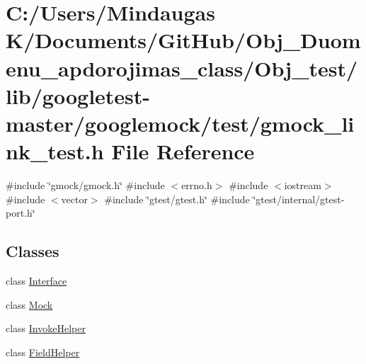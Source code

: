 \hypertarget{_obj__test_2lib_2googletest-master_2googlemock_2test_2gmock__link__test_8h}{}\section{C\+:/\+Users/\+Mindaugas K/\+Documents/\+Git\+Hub/\+Obj\+\_\+\+Duomenu\+\_\+apdorojimas\+\_\+class/\+Obj\+\_\+test/lib/googletest-\/master/googlemock/test/gmock\+\_\+link\+\_\+test.h File Reference}
\label{_obj__test_2lib_2googletest-master_2googlemock_2test_2gmock__link__test_8h}
{\ttfamily \#include \char`\"{}gmock/gmock.\+h\char`\"{}}\newline
{\ttfamily \#include $<$errno.\+h$>$}\newline
{\ttfamily \#include $<$iostream$>$}\newline
{\ttfamily \#include $<$vector$>$}\newline
{\ttfamily \#include \char`\"{}gtest/gtest.\+h\char`\"{}}\newline
{\ttfamily \#include \char`\"{}gtest/internal/gtest-\/port.\+h\char`\"{}}\newline
\subsection*{Classes}
\begin{DoxyCompactItemize}
\item 
class \mbox{\hyperlink{class_interface}{Interface}}
\item 
class \mbox{\hyperlink{class_mock}{Mock}}
\item 
class \mbox{\hyperlink{class_invoke_helper}{Invoke\+Helper}}
\item 
class \mbox{\hyperlink{class_field_helper}{Field\+Helper}}
\end{DoxyCompactItemize}
